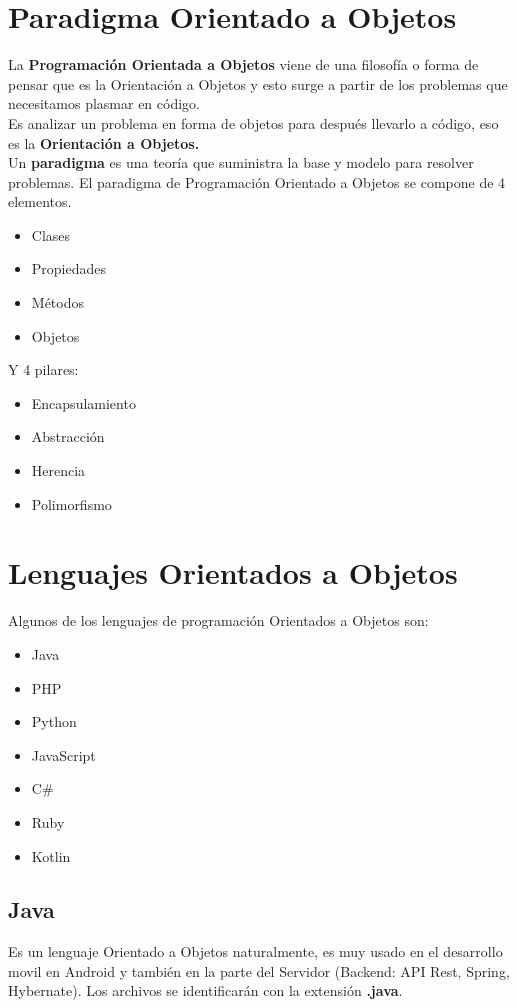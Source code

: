 \documentclass{article}
\begin{document}
\newpage
\section{Paradigma Orientado a Objetos}%
La \textbf{Programación Orientada a Objetos} viene de una filosofía o forma de
pensar que es la Orientación a Objetos y esto surge a partir de los problemas
que necesitamos plasmar en código.\\

Es analizar un problema en forma de objetos para después llevarlo a código, eso
es la \textbf{Orientación a Objetos.}\\

Un \textbf{paradigma} es una teoría que suministra la base y modelo para
resolver problemas. El paradigma de Programación Orientado a Objetos se compone
de 4 elementos.

\begin{itemize}
  \item Clases
  \item Propiedades
  \item Métodos
  \item Objetos
\end{itemize}

Y 4 pilares:

\begin{itemize}
  \item Encapsulamiento
  \item Abstracción
  \item Herencia
  \item Polimorfismo
\end{itemize}

\section{Lenguajes Orientados a Objetos}%
Algunos de los lenguajes de programación Orientados a Objetos son:
\begin{itemize}
  \item Java
  \item PHP
  \item Python
  \item JavaScript
  \item C\#
  \item Ruby
  \item Kotlin
\end{itemize}

\subsection*{Java}%
Es un lenguaje Orientado a Objetos naturalmente, es muy usado en el desarrollo
movil en Android y también en la parte del Servidor (Backend: API Rest, Spring,
Hybernate). Los archivos se identificarán con la extensión \textbf{.java}.
\end{document}

